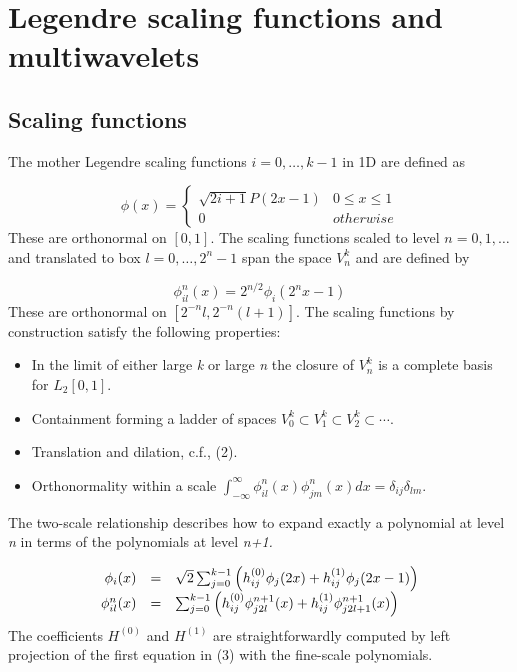 \documentclass[letterpaper]{article}
\newcommand\liststyleLi{%
\renewcommand\labelitemi{${\bullet}$}
\renewcommand\labelitemii{${\circ}$}
\renewcommand\labelitemiii{${\blacksquare}$}
\renewcommand\labelitemiv{${\bullet}$}
}
\begin{document}
\section{Legendre scaling functions and multiwavelets}
\subsection{Scaling functions}
The mother Legendre scaling functions  $i=0,\ldots ,k-1$ in 1D are defined as

\begin{equation}
\phi (x)=\left\{\begin{matrix}\sqrt{2i+1}P(2x-1)&0\le x\le 1\\0&\mathrm{\mathit{otherwise}}\end{matrix}\right.
\end{equation}
These are orthonormal on  $[0,1]$. The scaling functions scaled to level  $n=0,1,\ldots $ and translated to box 
$l=0,\ldots ,2^{n}-1$ span the space  $V_{n}^{k}$ and are defined by

\begin{equation}\label{seq:refText1}
\phi _{il}^{n}(x)=2^{n/2}\phi _{i}(2^{n}x-1)
\end{equation}
These are orthonormal on  $[2^{-n}l,2^{-n}(l+1)]$. The scaling functions by construction satisfy the following
properties:

\liststyleLi
\begin{itemize}
\item In the limit of either large \textit{k }or large \textit{n }the closure of  $V_{n}^{k}$ is a complete basis for 
$L_{2}[0,1]$.
\item Containment forming a ladder of spaces  $V_{0}^{k}\subset V_{1}^{k}\subset V_{2}^{k}\subset \cdots $.
\item Translation and dilation, c.f., (2).
\item Orthonormality within a scale  $\int _{-\infty }^{\infty }{\phi _{il}^{n}(x)\phi _{jm}^{n}(x)\mathit{dx}}=\delta
_{ij}\delta _{lm}$.
\end{itemize}
The two-scale relationship describes how to expand exactly a polynomial at level \textit{n }in terms of the polynomials
at level \textit{n+1.}

\begin{equation}\label{seq:refText2}
\begin{matrix}\hfill \phi _{i}(x)&\text{=}&\sqrt{2}\sum _{j=0}^{k-1}\left(h_{ij}^{(0)}\phi _{j}(2x)+h_{ij}^{(1)}\phi
_{j}(2x-1)\right)\\\phi _{il}^{n}(x)&\text{=}&\sum _{j=0}^{k-1}\left(h_{ij}^{(0)}\phi _{j2l}^{n+1}(x)+h_{ij}^{(1)}\phi
_{j2l+1}^{n+1}(x)\right)\hfill\null \end{matrix}
\end{equation}
The coefficients  $H^{(0)}$ and  $H^{(1)}$ are straightforwardly computed by left projection of the first equation in
(3) with the fine-scale polynomials.
\end{document}
